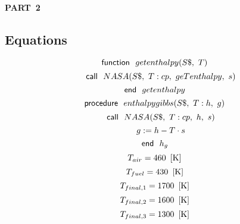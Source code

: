 \documentclass[10pt,fleqn]{article}
\newcommand{\F}[1]{\mbox{$#1$}}
\newcommand{\K}[1]{\mbox{\sf#1\ \ \mit}}
\newcommand{\V}[1]{\mbox{$ #1 $}}
\newcommand{\I}{\mbox{\hspace{0.20in}}}
\begin{document}
\begin{center}
\bf \mbox{PART 2}
\vspace{0.2 in}
\end{center}
\subsection*{Equations}
\begin{equation}
\label{EES Eqn:1}
\K{function} \F{getenthalpy}{ \left( S\$,\ T \right) } 
\end{equation}
\begin{equation}
\I \label{EES Eqn:2}
\K{call} \F{NASA}{ \left( S\$,\ T:\V{cp} ,\ \V{geTenthalpy} ,\ s \right) } 
\end{equation}
\begin{equation}
\label{EES Eqn:3}
\K{end} \V{getenthalpy}  
\end{equation}
\vspace{0.1 in}
\begin{equation}
\label{EES Eqn:4}
\K{procedure} \F{enthalpygibbs}{ \left( S\$,\ T:h,\ g \right) } 
\end{equation}
\begin{equation}
\I \label{EES Eqn:5}
\K{call} \F{NASA}{ \left( S\$,\ T:\V{cp} ,\ h,\ s \right) } 
\end{equation}
\begin{equation}
\I \label{EES Eqn:6}
g:=h-T\cdot s 
\end{equation}
\begin{equation}
\label{EES Eqn:7}
\K{end} h_{g} 
\end{equation}
\vspace{0.1 in}
\begin{equation}
\label{EES Eqn:8}
T_{air} = 460   \   \left[ \rm K \right] 
\end{equation}
\rm
\begin{equation}
\label{EES Eqn:9}
T_{fuel} = 430   \   \left[ \rm K \right] 
\end{equation}
\rm
\begin{equation}
\label{EES Eqn:10}
T_{final,1}= 1700   \   \left[ \rm K \right] 
\end{equation}
\rm
\begin{equation}
\label{EES Eqn:11}
T_{final,2}= 1600   \   \left[ \rm K \right] 
\end{equation}
\rm
\begin{equation}
\label{EES Eqn:12}
T_{final,3}= 1300   \   \left[ \rm K \right] 
\end{equation}
\end{document}
